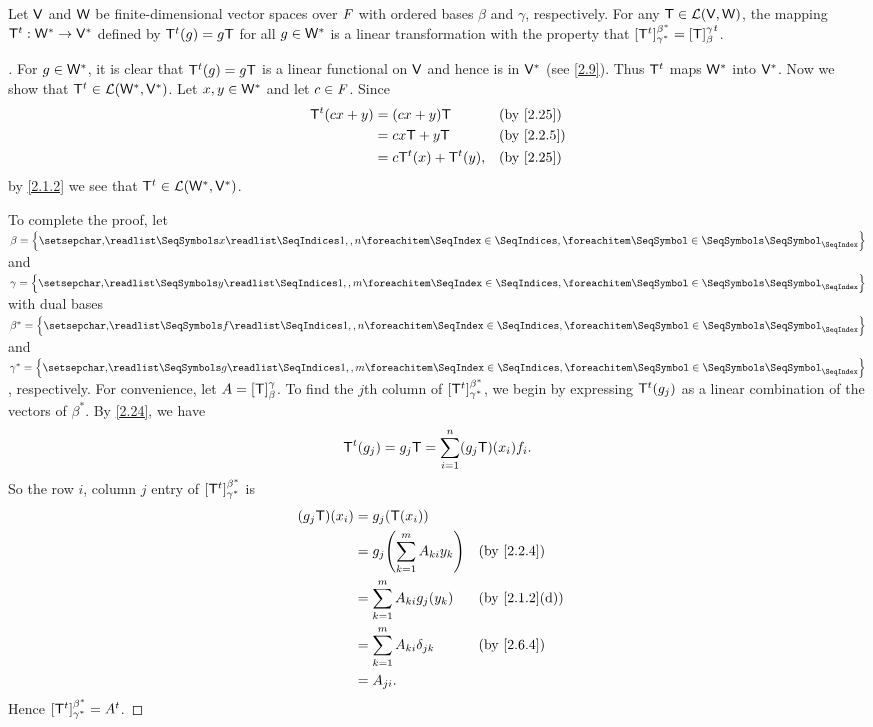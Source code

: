 \begin{thm}\label{2.25}
  Let \(\mathsf{V}\) and \(\mathsf{W}\) be finite-dimensional vector spaces over \(\mathit{F}\) with ordered bases \(\beta\) and \(\gamma\), respectively.
  For any \(\mathsf{T} \in \mathcal{L}(\mathsf{V}, \mathsf{W})\), the mapping \({\mathsf{T}}^{t} : \mathsf{W}^* \to \mathsf{V}^*\) defined by \({\mathsf{T}}^{t}(g) = g \mathsf{T}\) for all \(g \in \mathsf{W}^*\) is a linear transformation with the property that \([{\mathsf{T}}^{t}]_{\gamma^*}^{\beta^*} = {[\mathsf{T}]_{\beta}^{\gamma}}^{t}\).
\end{thm}

\begin{proof}[]
  For \(g \in \mathsf{W}^*\), it is clear that \({\mathsf{T}}^{t}(g) = g \mathsf{T}\) is a linear functional on \(\mathsf{V}\) and hence is in \(\mathsf{V}^*\) (see \cref{2.9}).
  Thus \({\mathsf{T}}^{t}\) maps \(\mathsf{W}^*\) into \(\mathsf{V}^*\).
  Now we show that \({\mathsf{T}}^{t} \in \mathcal{L}(\mathsf{W}^*, \mathsf{V}^*)\).
  Let \(x, y \in \mathsf{W}^*\) and let \(c \in \mathit{F}\).
  Since
  \begin{align*}
    \tp{\T}(cx + y) & = (cx + y) \T                &  & \text{(by \cref{2.25})}  \\
                    & = c x \T + y \T              &  & \text{(by \cref{2.2.5})} \\
                    & = c \tp{\T}(x) + \tp{\T}(y), &  & \text{(by \cref{2.25})}
  \end{align*}
  by \cref{2.1.2} we see that \({\mathsf{T}}^{t} \in \mathcal{L}(\mathsf{W}^*, \mathsf{V}^*)\).

  To complete the proof, let \(\beta = \set{\seq{x}{1,,n}}\) and \(\gamma = \set{\seq{y}{1,,m}}\) with dual bases \(\beta^* = \set{\seq{f}{1,,n}}\) and \(\gamma^* = \set{\seq{g}{1,,m}}\), respectively.
  For convenience, let \(A = [\mathsf{T}]_{\beta}^{\gamma}\).
  To find the \(j\)th column of \([{\mathsf{T}}^{t}]_{\gamma^*}^{\beta^*}\), we begin by expressing \({\mathsf{T}}^{t}(g_j)\) as a linear combination of the vectors of \(\beta^*\).
  By \cref{2.24}, we have
  \[
    {\mathsf{T}}^{t}(g_j) = g_j \mathsf{T} = \sum_{i = 1}^n (g_j \mathsf{T})(x_i) f_i.
  \]
  So the row \(i\), column \(j\) entry of \([{\mathsf{T}}^{t}]_{\gamma^*}^{\beta^*}\) is
  \begin{align*}
    (g_j \T)(x_i) & = g_j(\T(x_i))                                                         \\
                  & = g_j \pa{\sum_{k = 1}^m A_{k i} y_k} &  & \text{(by \cref{2.2.4})}    \\
                  & = \sum_{k = 1}^m A_{k i} g_j(y_k)     &  & \text{(by \cref{2.1.2}(d))} \\
                  & = \sum_{k = 1}^m A_{k i} \delta_{j k} &  & \text{(by \cref{2.6.4})}    \\
                  & = A_{j i}.
  \end{align*}
  Hence \([{\mathsf{T}}^{t}]_{\gamma^*}^{\beta^*} = {A}^{t}\).
\end{proof}

